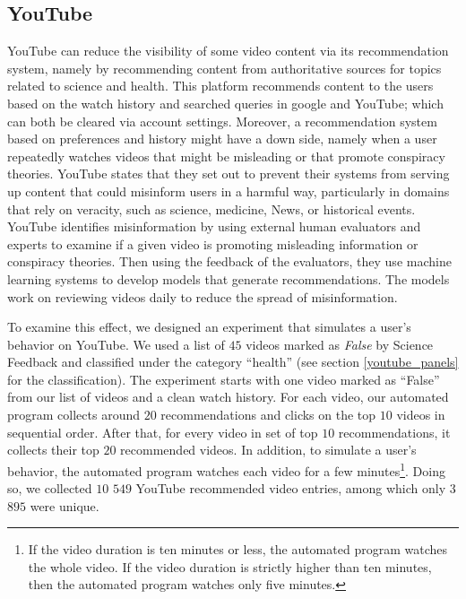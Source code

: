 \documentclass{article}
\begin{document}
\subsection{YouTube}


YouTube can reduce the visibility of some video content via its recommendation system, namely by recommending content from authoritative sources for topics related to science and health. This platform recommends content to the users based on the watch history and searched queries in google and YouTube; which can both be cleared via account settings. Moreover, a recommendation system based on preferences and history might have a down side, namely when a user repeatedly watches videos that might be misleading or that promote conspiracy theories. YouTube states that they set out to prevent their systems from serving up content that could misinform users in a harmful way, particularly in domains that rely on veracity, such as science, medicine, News, or historical events.  YouTube identifies misinformation by using external human evaluators and experts to examine if a given video is promoting misleading information or conspiracy theories. Then using the feedback of the evaluators, they use machine learning systems to develop models that generate recommendations. The models work on reviewing videos daily to reduce the spread of misinformation. 

\smallskip

To examine this effect, we designed an experiment that simulates a user's behavior on YouTube. We used a list of $45$ videos marked as {\it False} by Science Feedback and classified under the category ``health'' (see section \ref{youtube_panels} for the classification). The experiment starts with one video marked as ``False'' from our list of videos and a clean watch history. For each video, our automated program collects around $20$ recommendations and clicks on the top $10$ videos in sequential order. After that, for every video in set of top $10$ recommendations, it collects their top $20$ recommended videos. In addition, to simulate a user's behavior, the automated program watches each video for a few minutes\footnote{If the video duration is ten minutes or less, the automated program watches the whole video. If the video duration is strictly higher than ten minutes, then the automated program watches only five minutes.}. Doing so, we collected $10$ $549$ YouTube recommended video entries, among which only $3$ $895$ were unique. 
\end{document}
